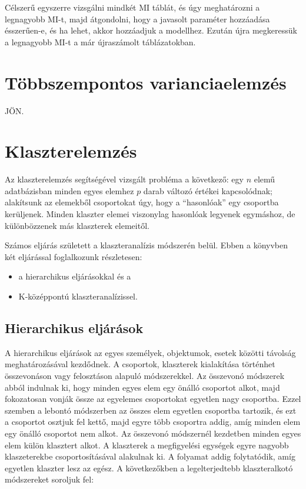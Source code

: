 \documentclass[
  letterpaper,
]{krantz}
\providecommand{\tightlist}{%
  \setlength{\itemsep}{0pt}\setlength{\parskip}{0pt}}\usepackage{longtable,booktabs,array}
\begin{document}
Célszerű egyszerre vizsgálni mindkét MI táblát, és úgy meghatározni a
legnagyobb MI-t, majd átgondolni, hogy a javasolt paraméter hozzáadása
ésszerűen-e, és ha lehet, akkor hozzáadjuk a modellhez. Ezután újra
megkeressük a legnagyobb MI-t a már újraszámolt táblázatokban.


\hypertarget{sec-tobbszempontos-varianciaelemzes}{%
\chapter{Többszempontos
varianciaelemzés}\label{sec-tobbszempontos-varianciaelemzes}}

JÖN.


\hypertarget{sec-klaszterelemzes}{%
\chapter{Klaszterelemzés}\label{sec-klaszterelemzes}}

Az klaszterelemzés segítségével vizsgált probléma a következő: egy \(n\)
elemű adatbázisban minden egyes elemhez \(p\) darab változó értékei
kapcsolódnak; alakítsunk az elemekből csoportokat úgy, hogy a
``hasonlóak'' egy csoportba kerüljenek. Minden klaszter elemei
viszonylag hasonlóak legyenek egymáshoz, de különbözzenek más klaszterek
elemeitől.

Számos eljárás született a klaszteranalízis módszerén belül. Ebben a
könyvben két eljárással foglalkozunk részletesen:

\begin{itemize}
\tightlist
\item
  a hierarchikus eljárásokkal és a
\item
  K-középpontú klaszteranalízissel.
\end{itemize}

\hypertarget{hierarchikus-eljuxe1ruxe1sok}{%
\section{Hierarchikus eljárások}\label{hierarchikus-eljuxe1ruxe1sok}}

A hierarchikus eljárások az egyes személyek, objektumok, esetek közötti
távolság meghatározásával kezdődnek. A csoportok, klaszterek kialakítása
történhet összevonáson vagy felosztáson alapuló módszerekkel. Az
összevonó módszerek abból indulnak ki, hogy minden egyes elem egy önálló
csoportot alkot, majd fokozatosan vonják össze az egyelemes csoportokat
egyetlen nagy csoportba. Ezzel szemben a lebontó módszerben az összes
elem egyetlen csoportba tartozik, és ezt a csoportot osztjuk fel kettő,
majd egyre több csoportra addig, amíg minden elem egy önálló csoportot
nem alkot. Az összevonó módszernél kezdetben minden egyes elem külön
klasztert alkot. A klaszterek a megfigyelési egységek egyre nagyobb
klaszeterekbe csoportosításával alakulnak ki. A folyamat addig
folytatódik, amíg egyetlen klaszter lesz az egész. A következőkben a
legelterjedtebb klaszteralkotó módszereket soroljuk fel:
\end{document}
